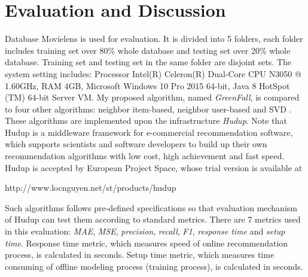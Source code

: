 \documentclass{sig-alternate}
\begin{document}
\section{Evaluation and Discussion} \label{section:evaluation}
Database Movielens \cite{groupLens:movielens} is used for evaluation. It is divided into 5 folders, each folder includes training set over 80\% whole database and testing set over 20\% whole database. Training set and testing set in the same folder are disjoint sets. The system setting includes: Processor Intel(R) Celeron(R) Dual-Core CPU N3050 @ 1.60GHz, RAM 4GB, Microsoft Windows 10 Pro 2015 64-bit, Java 8 HotSpot (TM) 64-bit Server VM. My proposed algorithm, named \textit{GreenFall}, is compared to four other algorithms: neighbor item-based, neighbor user-based and SVD \cite[pp.~151-152]{ricci:recommender}. These algorithms are implemented upon the infrastructure \textit{Hudup}. Note that Hudup is a middleware framework for e-commercial recommendation software, which supports scientists and software developers to build up their own recommendation algorithms with low cost, high achievement and fast speed. Hudup is accepted by European Project Space, whose trial version is available at

http://www.locnguyen.net/st/products/hudup

Such algorithms follows pre-defined specifications so that evaluation mechanism of Hudup can test them according to standard metrics. There are 7 metrics \cite[pp.~19-39]{herlocker:evaluation} used in this evaluation: \textit{MAE}, \textit{MSE}, \textit{precision}, \textit{recall}, \textit{F1}, \textit{response time} and \textit{setup time}. Response time metric, which measures speed of online recommendation process, is calculated in seconds. Setup time metric, which measures time consuming of offline modeling process (training process), is calculated in seconds.
\end{document}
